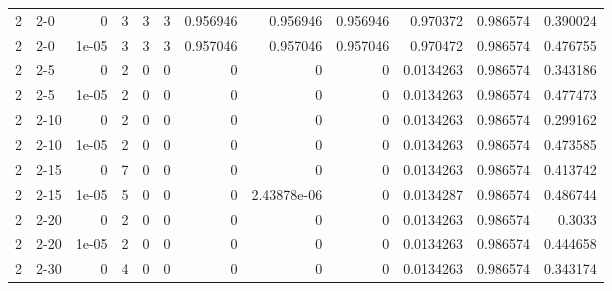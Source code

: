 \begin{tabular}{rlrrrrrrrrrr}
     2 & 2-0    &      0     &           3 &                 3 &                 3 &     0.956946    &     0.956946    &      0.956946    &        0.970372  &               0.986574 &           0.390024 \\
     2 & 2-0    &      1e-05 &           3 &                 3 &                 3 &     0.957046    &     0.957046    &      0.957046    &        0.970472  &               0.986574 &           0.476755 \\
     2 & 2-5    &      0     &           2 &                 0 &                 0 &     0           &     0           &      0           &        0.0134263 &               0.986574 &           0.343186 \\
     2 & 2-5    &      1e-05 &           2 &                 0 &                 0 &     0           &     0           &      0           &        0.0134263 &               0.986574 &           0.477473 \\
     2 & 2-10   &      0     &           2 &                 0 &                 0 &     0           &     0           &      0           &        0.0134263 &               0.986574 &           0.299162 \\
     2 & 2-10   &      1e-05 &           2 &                 0 &                 0 &     0           &     0           &      0           &        0.0134263 &               0.986574 &           0.473585 \\
     2 & 2-15   &      0     &           7 &                 0 &                 0 &     0           &     0           &      0           &        0.0134263 &               0.986574 &           0.413742 \\
     2 & 2-15   &      1e-05 &           5 &                 0 &                 0 &     0           &     2.43878e-06 &      0           &        0.0134287 &               0.986574 &           0.486744 \\
     2 & 2-20   &      0     &           2 &                 0 &                 0 &     0           &     0           &      0           &        0.0134263 &               0.986574 &           0.3033   \\
     2 & 2-20   &      1e-05 &           2 &                 0 &                 0 &     0           &     0           &      0           &        0.0134263 &               0.986574 &           0.444658 \\
     2 & 2-30   &      0     &           4 &                 0 &                 0 &     0           &     0           &      0           &        0.0134263 &               0.986574 &           0.343174 \\

\end{tabular}
